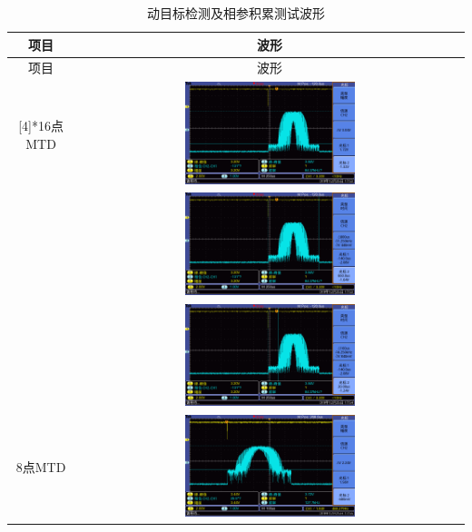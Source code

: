 \documentclass[12pt]{article}
\begin{document}
\begin{longtable}{|c|c|}
    \caption{动目标检测及相参积累测试波形}
    \label{tab:MTDBXT2}\\
    \hline
    项目&波形\\
    \hline
    \endfirsthead

    \hline
    项目&波形\\
    \hline
    \endhead

    \hline
    \endfoot

\hline
    \endlastfoot

   \multirow{3}[4]{*}{16点MTD} &\includegraphics[width=0.45\textwidth]{data/new2/F0010TEK}  \\
   &\includegraphics[width=0.45\textwidth]{data/new2/F0011TEK}\\
      &\includegraphics[width=0.45\textwidth]{data/new2/F0012TEK}\\
      \hline
      \multirow{3}[4]{*}{8点MTD} &\includegraphics[width=0.45\textwidth]{data/new2/F0013TEK}  \\

\end{longtable}
\end{document}
